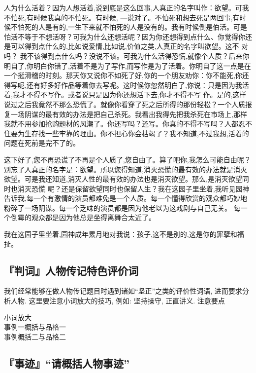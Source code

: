 \documentclass{ctexart}
\begin{document}
人为什么活着？因为人想活着,说到底是这么回事,人真正的名字叫作：欲望。可我不怕死,有时候我真的不怕死。有时候, ---说对了。不怕死和想去死是两回事,有时候不怕死的人是有的,一生下来就不怕死的人是没有的。我有时候倒是伯活。可是怕活不等于不想活呀？可我为什么还想活呢？因为你还想得到点什么、你觉得你还是可以得到点什么的,比如说爱情,比如说,价值之类,人真正的名字叫欲望。这不 对吗？ 我不该得到点什么吗？没说不该。可我为什么活得恐慌,就像个人质？后来你明自了,你明白你错了,活着不是为了写作,而写作是为了活着。你明自了这一点是在一个挺滑稽的时刻。那天你又说你不如死了好,你的一个朋友劝你：你不能死,你还得写呢,还有好多好作品等着你去写呢。这时候你忽然明白了,你说：只是因为我活着,我才不得不写作。或者说只是因为你还想活下去,你才不得不写 作。是的,这样说过之后我竟然不那么恐慌了。就像你看穿了死之后所得的那份轻松？一个人质报复一场阴谋的最有效的办法是把自己杀死。我看出我得先把我杀死在市场上,那样我就不用参加抢购题材的风潮了。你还写吗？还写。你真的不得不写吗？人都忍不住要为生存找一些牢靠的理由。你不担心你会枯竭了？我不知道,不过我想,活着的问题在死前是完不了的。

这下好了,您不再恐谎了不再是个人质了,您自由了。算了吧你,我怎么可能自由呢？别忘了人真正的名字是：欲望。所以您得知道,消灭恐慌的最有效的办法就是消灭欲望。可是我还知道,消灭人性的最有效的办法也是消灭欲望。那么,是消灭欲望同时也消灭恐慌 呢？还是保留欲望同时也保留人生？我在这园子里坐着,我听见园神告诉我,每一个有激情的演员都难免是一个人质。每一个懂得欣赏的观众都巧妙地粉碎了一场阴谋。每一个乏味的演员都是因为他老以为这戏剧与自己无关。 每一个倒霉的观众都是因为他总是坐得离舞合太近了。

我在这园子里坐着,园神成年累月地对我说：孩子,这不是别的,这是你的罪孽和福扯。

\subsection{『判词』人物传记特色评价词}

我们经常能够在做人物传记题目时遇到诸如``坚正''之类的评价性词语, 进而要求分析人物. 这里要注意小词放大的技巧, 例如: \LARGE 坚\large 持操守, \LARGE 正\large 直讲义. 注意要点

\begin{description}
	\item[小词放大]
	\item[事例一概括与品格一]
	\item[事例概括二与品格二]
\end{description}

\subsection{『事迹』``请概括人物事迹''}
\large
\end{document}
